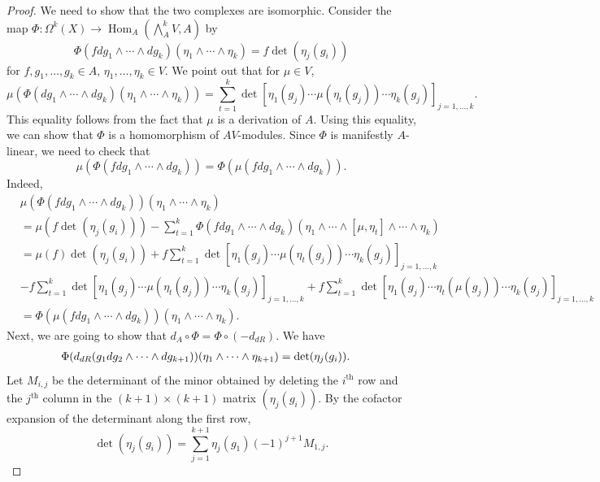 \documentclass[12pt]{amsart}
\newcommand{\Hom}{{\operatorname{Hom}}}
\newcommand{\DR}{{\textup{dR}}}
\theoremstyle{definition}
\begin{document}
\begin{proof}
We need to show that the two complexes are isomorphic. Consider the map $\Phi: \Omega^k(X) \rightarrow \Hom_A \left( \bigwedge^k_A V, A \right)$ by
\[
\Phi(f dg_1 \wedge \cdots \wedge dg_k) (\eta_1 \wedge \cdots \wedge \eta_k) = f \det (\eta_j(g_i))
\]
for $f, g_1, \dots, g_k \in A, \, \eta_1, \dots, \eta_k \in V$. 
We point out that for $\mu \in V$,
\[ 
\mu \left( \Phi(dg_1 \wedge \cdots \wedge dg_k) (\eta_1 \wedge \cdots \wedge \eta_k) \right) =
\sum_{t=1}^k \det \left[ \eta_1(g_j) \cdots \mu(\eta_t (g_j)) \cdots \eta_k(g_j) \right]_{j=1, \ldots, k}.
\]
This equality follows from the fact that $\mu$ is a derivation of $A$. Using this equality, we can show that 
$\Phi$ is a homomorphism of $AV$-modules. Since $\Phi$ is manifestly $A$-linear, we need to check that
\[
\mu \left( \Phi(f dg_1 \wedge \cdots \wedge dg_k) \right) = \Phi \left( \mu(f dg_1 \wedge \cdots \wedge dg_k) \right). 
\]
Indeed,
\begin{align*}
&\mu \left( \Phi(f dg_1 \wedge \cdots \wedge dg_k) \right) (\eta_1 \wedge \cdots \wedge \eta_k) \\
&= \mu \left( f \det (\eta_j(g_i)) \right) - \sum_{t=1}^k  \Phi(f dg_1 \wedge \cdots \wedge dg_k) 
(\eta_1 \wedge \cdots \wedge [\mu, \eta_t] \wedge \cdots \wedge \eta_k) \\
&= \mu(f) \det (\eta_j(g_i)) 
+ f \sum_{t=1}^k \det \left[ \eta_1(g_j) \cdots \mu(\eta_t (g_j)) \cdots \eta_k(g_j) \right]_{j=1, \ldots, k} \\
&-  f \sum_{t=1}^k \det \left[ \eta_1(g_j) \cdots \mu(\eta_t (g_j)) \cdots \eta_k(g_j) \right]_{j=1, \ldots, k}
+  f \sum_{t=1}^k \det \left[ \eta_1(g_j) \cdots \eta_t(\mu (g_j)) \cdots \eta_k(g_j) \right]_{j=1, \ldots, k} \\
&=  \Phi \left( \mu(f dg_1 \wedge \cdots \wedge dg_k) \right) (\eta_1 \wedge \cdots \wedge \eta_k) .
\end{align*}
Next, we are going to show that $d_A \circ \Phi = \Phi \circ (-d_{dR})$. We have
\begin{align*}
\Phi(d_{\DR}(g_1 dg_2 \wedge \cdots \wedge dg_{k+1}))(\eta_1\wedge \cdots \wedge \eta_{k+1}) & = \det (\eta_j(g_{i})).
\end{align*}
 Let $M_{i,j}$ be the determinant of the minor obtained by deleting the $i^\text{th}$ row and the $j^\text{th}$ column in the $(k+1) \times (k+1)$ matrix $(\eta_j (g_i))$. 
  By the cofactor expansion of the determinant along the first row,
\[
\det (\eta_j(g_{i})) = \sum_{j=1}^{k+1} \eta_j(g_1) (-1)^{j+1} M_{1,j}.
\]

\end{proof}
\end{document}
